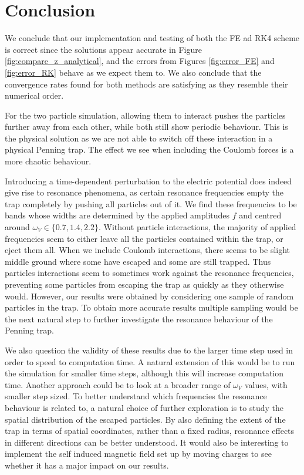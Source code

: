 \section{Conclusion}\label{sec:conclusion}

We conclude that our implementation and testing of both the FE ad RK4 scheme is correct since the solutions appear accurate in Figure \ref{fig:compare_z_analytical}, and the errors from Figures \ref{fig:error_FE} and \ref{fig:error_RK} behave as we expect them to. We also conclude that the convergence rates found for both methods are satisfying as they resemble their numerical order. 


For the two particle simulation, allowing them to interact pushes the particles further away from each other, while both still show periodic behaviour. This is the physical solution as we are not able to switch off these interaction in a physical Penning trap. The effect we see when including the Coulomb forces is a more chaotic behaviour. 

Introducing a time-dependent perturbation to the electric potential does indeed give rise to resonance phenomena, as certain resonance frequencies empty the trap completely by pushing all particles out of it. We find these frequencies to be bands whose widths are determined by the applied amplitudes $f$ and centred around $\omega_V\in\{0.7, 1.4, 2.2\}$. Without particle interactions, the majority of applied frequencies seem to either leave all the particles contained within the trap, or eject them all. When we include Coulomb interactions, there seems to be slight middle ground where some have escaped and some are still trapped. Thus particles interactions seem to sometimes work against the resonance frequencies, preventing some particles from escaping the trap as quickly as they otherwise would. However, our results were obtained by considering one sample of random particles in the trap. To obtain more accurate results multiple sampling would be the next natural step to further investigate the resonance behaviour of the Penning trap.  

We also question the validity of these results due to the larger time step used in order to speed to computation time. A natural extension of this would be to run the simulation for smaller time steps, although this will increase computation time. Another approach could be to look at a broader range of $\omega_V$ values, with smaller step sized. To better understand which frequencies the resonance behaviour is related to, a natural choice of further exploration is to study the spatial distribution of the escaped particles. By also defining the extent of the trap in terms of spatial coordinates, rather than a fixed radius, resonance effects in different directions can be better understood. It would also be interesting to implement the self induced magnetic field set up by moving charges to see whether it has a major impact on our results. 


